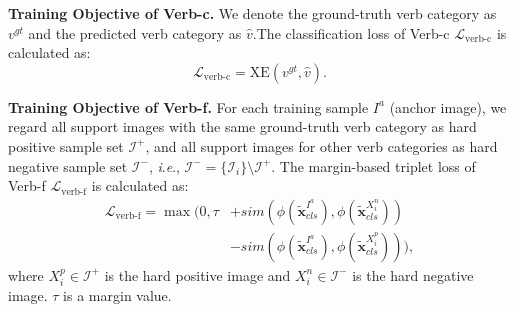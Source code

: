 \documentclass[letterpaper]{article} \usepackage{aaai22}  \usepackage{times}  \usepackage{helvet}  \usepackage{courier}  \usepackage[hyphens]{url}  \usepackage{graphicx} \urlstyle{rm} \def\UrlFont{\rm}  \usepackage{natbib}  \usepackage{caption} \DeclareCaptionStyle{ruled}{labelfont=normalfont,labelsep=colon,strut=off} \frenchspacing  \setlength{\pdfpagewidth}{8.5in}  \setlength{\pdfpageheight}{11in}
\newcommand{\ie}{\textit{i}.\textit{e}.}
\begin{document}
\noindent\textbf{Training Objective of Verb-c.}
We denote the ground-truth verb category as $v^{gt}$ and the predicted verb category as $\hat{v}$.The classification loss of Verb-c $\mathcal{L}_{\text{verb-c}}$ is calculated as:
\begin{equation}
    \mathcal{L}_{\text{verb-c}} = \text{XE}(v^{gt}, \hat{v}).
\end{equation}

\noindent\textbf{Training Objective of Verb-f.}
For each training sample $I^a$ (anchor image), we regard all support images with the same ground-truth verb category as hard positive sample set $\mathcal{I}^+$, and all support images for other verb categories as hard negative sample set $\mathcal{I}^-$, \ie, $\mathcal{I}^- = \{\mathcal{I}_i\}\setminus \mathcal{I}^+$. The margin-based triplet loss of Verb-f $\mathcal{L}_{\text{verb-f}}$ is calculated as: 
\begin{equation}
\begin{aligned}
    \mathcal{L}_{\text{verb-f}} = \max (0, \tau & +  sim(\phi(\tilde{\bm{x}}_{cls}^{I^{a}}), 
    \phi (\tilde{\bm{x}}_{cls}^{X_{i}^{n}}))  \\
    & - sim(\phi(\tilde{\bm{x}}_{cls}^{I^{a}}), \phi (\tilde{\bm{x}}_{cls}^{X_{i}^{p}}))),
\end{aligned}
\end{equation}
where $X_{i}^{p} \in \mathcal{I}^{+} $ is the hard positive image and  $X_{i}^{n} \in \mathcal{I}^{-} $ is the hard negative image. $\tau$ is a margin value.
\end{document}
